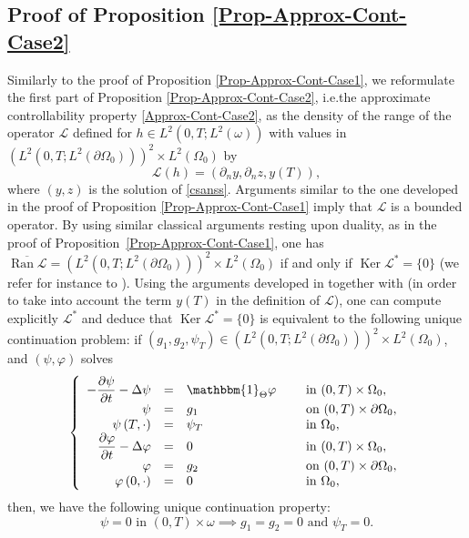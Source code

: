 \documentclass[10pt,a4paper]{amsart}
\providecommand{\ie}{i.e.}
\DeclareMathOperator{\Ker}{Ker}
\DeclareMathOperator{\Ran}{Ran}
\theoremstyle{definition}
\begin{document}
\subsection{Proof of Proposition \ref{Prop-Approx-Cont-Case2}}\label{Subsec-Proof-ApproxCont-Case2}

Similarly to the proof of Proposition \ref{Prop-Approx-Cont-Case1}, we reformulate the first part of Proposition \ref{Prop-Approx-Cont-Case2}, \ie the approximate controllability property \eqref{Approx-Cont-Case2}, as the density of the range of the operator $\mathcal{L}$ defined for $h \in L^2(0,T; L^2(\omega))$ with values in $(L^2(0,T; L^2(\partial \Omega_0)))^2 \times L^2(\Omega_0)$ by
\[
\mathcal{L} (h) = (\partial_n y, \partial_n z, y(T)),
\]
where $(y,z)$ is the solution of \eqref{csanss}. Arguments similar to the one developed in the proof of Proposition \ref{Prop-Approx-Cont-Case1} imply that $\mathcal L$ is a bounded operator.
By using similar classical arguments resting upon duality, as in the proof of Proposition~\ref{Prop-Approx-Cont-Case1}, one has $\overline{\Ran \mathcal{L}} = (L^2(0,T; L^2(\partial \Omega_0)))^2 \times L^2(\Omega_0)$ if and only if $\Ker \mathcal{L}^* = \{0\}$ (we refer for instance to \cite[Cor.\,2.18]{Brezis}). Using the arguments developed in \cite[Prop.\,2.1]{Lissy-Privat-Simpore} together with \cite[Th.\,2.43, p.\,56]{CNL} (in order to take into account the term $y(T)$ in the definition of $\mathcal L$), one can compute explicitly $\mathcal L^*$ and deduce that $\Ker\mathcal{L}^* = \{0\}$ is equivalent to the following unique continuation problem: if $(g_1, g_2, \psi_T) \in (L^2(0,T; L^2(\partial\Omega_0)))^2\times L^2(\Omega_0)$, and $(\psi, \varphi)$ solves
\begin{equation}
\label{Coupled-Heat-Approx-Adj-Case2}
\left\{
\begin{array}{rcll}
- \dfrac{\partial \psi}{\partial t}-\Delta \psi &=&\mathbbm{1}_{\Theta}\varphi \quad&\text{ in }(0,T) \times \Omega_0,
\\
\psi &=& g_1 &\text{ on }(0,T) \times \partial \Omega_0,
\\
\psi \left(T,\cdot\right) &=& \psi_T &\text{ in }\Omega_0,
\\
\dfrac{\partial \varphi}{\partial t}-\Delta \varphi &=& 0 &\text{ in }(0,T) \times \Omega_0,
\\
\varphi &=& g_2 &\text{ on }(0,T) \times \partial \Omega_0,
\\
\varphi\left(0,\cdot\right) &=&0 &\text{ in }\Omega_0,
\end{array}
\right.
\end{equation}
then, we have the following unique continuation property:
\begin{equation}
\label{UC-Adj-Coupled-Case2}
\psi = 0 \text{ in } (0,T) \times \omega \implies g_1 =g_2 = 0 \text{ and } \psi_T = 0.
\end{equation}
\end{document}
